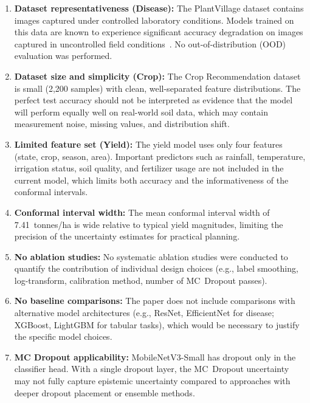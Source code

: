 \documentclass[conference]{IEEEtran}
\begin{document}
\begin{enumerate}[leftmargin=*]
  \item \textbf{Dataset representativeness (Disease):} The PlantVillage dataset contains images captured under controlled laboratory conditions. Models trained on this data are known to experience significant accuracy degradation on images captured in uncontrolled field conditions~\cite{barbedo2018factors}. No out-of-distribution (OOD) evaluation was performed.

  \item \textbf{Dataset size and simplicity (Crop):} The Crop Recommendation dataset is small (2,200 samples) with clean, well-separated feature distributions. The perfect test accuracy should not be interpreted as evidence that the model will perform equally well on real-world soil data, which may contain measurement noise, missing values, and distribution shift.

  \item \textbf{Limited feature set (Yield):} The yield model uses only four features (state, crop, season, area). Important predictors such as rainfall, temperature, irrigation status, soil quality, and fertilizer usage are not included in the current model, which limits both accuracy and the informativeness of the conformal intervals.

  \item \textbf{Conformal interval width:} The mean conformal interval width of 7.41~tonnes/ha is wide relative to typical yield magnitudes, limiting the precision of the uncertainty estimates for practical planning.

  \item \textbf{No ablation studies:} No systematic ablation studies were conducted to quantify the contribution of individual design choices (e.g., label smoothing, log-transform, calibration method, number of MC~Dropout passes).

  \item \textbf{No baseline comparisons:} The paper does not include comparisons with alternative model architectures (e.g., ResNet, EfficientNet for disease; XGBoost, LightGBM for tabular tasks), which would be necessary to justify the specific model choices.

  \item \textbf{MC Dropout applicability:} MobileNetV3-Small has dropout only in the classifier head. With a single dropout layer, the MC~Dropout uncertainty may not fully capture epistemic uncertainty compared to approaches with deeper dropout placement or ensemble methods.


\end{enumerate}
\end{document}

